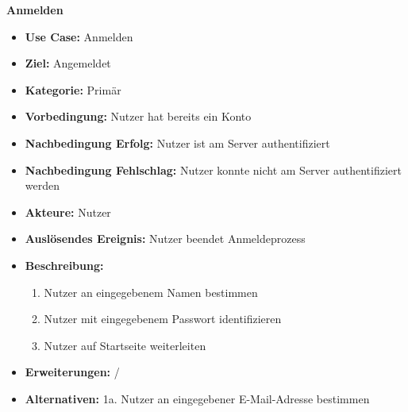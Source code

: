 \textbf{Anmelden}
\begin{itemize}
	\item \textbf{Use Case:} Anmelden
	\item \textbf{Ziel:} Angemeldet
	\item \textbf{Kategorie:} Primär
	\item \textbf{Vorbedingung:} Nutzer hat bereits ein Konto
	\item \textbf{Nachbedingung Erfolg:} Nutzer ist am Server authentifiziert
	\item \textbf{Nachbedingung Fehlschlag:} Nutzer konnte nicht am Server authentifiziert werden
	\item \textbf{Akteure:} Nutzer
	\item \textbf{Auslösendes Ereignis:} Nutzer beendet Anmeldeprozess
	\item \textbf{Beschreibung:} \begin{enumerate}
		\item Nutzer an eingegebenem Namen bestimmen
		\item Nutzer mit eingegebenem Passwort identifizieren
		\item Nutzer auf Startseite weiterleiten
	\end{enumerate}
	\item \textbf{Erweiterungen:} /
	\item \textbf{Alternativen:} 1a. Nutzer an eingegebener E-Mail-Adresse bestimmen
\end{itemize}
\clearpage


